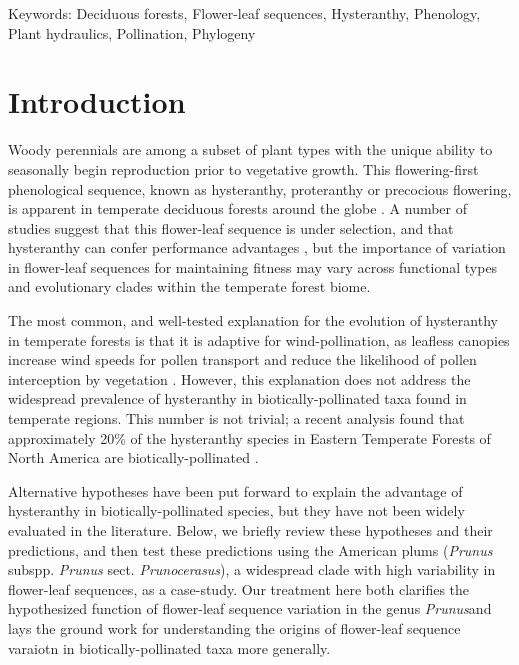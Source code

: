 \documentclass{article}[12pt]
\begin{document}
Keywords: Deciduous forests, Flower-leaf sequences, Hysteranthy, Phenology, Plant hydraulics, Pollination, Phylogeny

\pagebreak
\section*{Introduction}
\noindent Woody perennials are among a subset of plant types with the unique ability to seasonally begin reproduction prior to vegetative growth. This flowering-first phenological sequence, known as hysteranthy, proteranthy or precocious flowering, is apparent in temperate deciduous forests around the globe \citep{Rathcke_1985}. A number of studies suggest that this flower-leaf sequence is under selection, and that hysteranthy can confer performance advantages \citep{Gougherty2018,Buonaiuto2020,Guo2014}, but the importance of variation in flower-leaf sequences for maintaining fitness may vary across functional types and evolutionary clades within the temperate forest biome. %

\noindent The most common, and well-tested explanation for the evolution of hysteranthy in temperate forests is that it is adaptive for wind-pollination, as leafless canopies increase wind speeds for pollen transport and reduce the likelihood of pollen interception by vegetation \citep{Whitehead1969,Niklas1985}. However, this explanation does not address the widespread prevalence of hysteranthy in biotically-pollinated taxa found in temperate regions. This number is not trivial; a recent analysis found that approximately 20\% of the hysteranthy species in Eastern Temperate Forests of North America are biotically-pollinated \citep{Buonaiuto2020}. 

Alternative hypotheses have been put forward to explain the advantage of hysteranthy in biotically-pollinated species, but they have not been widely evaluated in the literature. Below, we briefly review these hypotheses and their predictions, and then test these predictions using the American plums (\textit{Prunus} subspp. \textit{Prunus} sect. \textit{Prunocerasus}), a widespread clade with high variability in flower-leaf sequences, as a case-study. Our treatment here both clarifies the hypothesized function of flower-leaf sequence variation in the genus \emph{Prunus}and lays the ground work for understanding the origins of flower-leaf sequence varaiotn in biotically-pollinated taxa more generally.%
\end{document}
